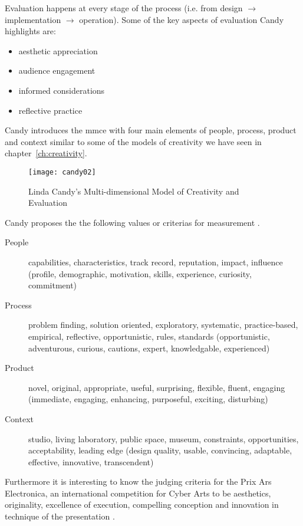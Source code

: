 Evaluation happens at every stage of the process (i.e. from design $\to$ implementation $\to$ operation). Some of the key aspects of evaluation Candy highlights are:

\begin{itemize}
  \item aesthetic appreciation
  \item audience engagement
  \item informed considerations
  \item reflective practice
\end{itemize}

Candy introduces the \gls{mmce} with four main elements of people, process, product and context \autocite[p.11]{Candy2012} similar to some of the models of creativity we have seen in chapter~\ref{ch:creativity}.

\begin{figure}[htb] %
  \centering
  \texttt{[image: candy02]}
\caption[Multi-dimensional Model of Creativity and Evaluation]{Linda Candy's Multi-dimensional Model of Creativity and Evaluation}
\label{fig:candy02}
\end{figure}

Candy proposes the the following values or criterias for measurement \autocite{Candy2012}.

\begin{description}
  \item [People] capabilities, characteristics, track record, reputation, impact, influence (profile, demographic, motivation, skills, experience, curiosity, commitment)
  \item [Process] problem finding, solution oriented, exploratory, systematic, practice-based, empirical, reflective, opportunistic, rules, standards (opportunistic, adventurous, curious, cautions, expert, knowledgable, experienced)
  \item [Product] novel, original, appropriate, useful, surprising, flexible, fluent, engaging (immediate, engaging, enhancing, purposeful, exciting, disturbing)
  \item [Context] studio, living laboratory, public space, museum, constraints, opportunities, acceptability, leading edge (design quality, usable, convincing, adaptable, effective, innovative, transcendent)
\end{description}

Furthermore it is interesting to know the judging criteria for the Prix Ars Electronica, an international competition for Cyber Arts to be aesthetics, originality, excellence of execution, compelling conception and innovation in technique of the presentation \autocite[cited in][p.18]{Candy2012}.

